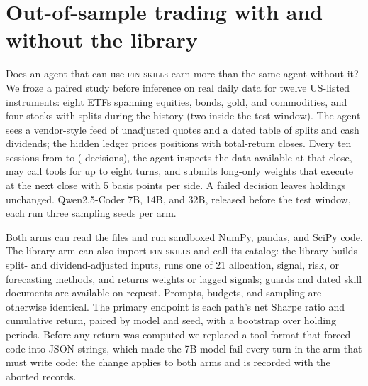 \section{Out-of-sample trading with and without the library}
\label{sec:trading}
Does an agent that can use \textsc{fin-skills} earn more than the same agent without it?
We froze a paired study before inference on real daily data for twelve US-listed
instruments: eight ETFs spanning equities, bonds, gold, and commodities, and four stocks
with splits during the history (two inside the test window). The agent sees a vendor-style
feed of unadjusted quotes and a dated table of splits and cash dividends; the hidden ledger
prices positions with total-return closes. Every ten sessions from
\TRWindowStart{} to \TRWindowEnd{} (\TRDecisions{} decisions), the agent inspects the data
available at that close, may call tools for up to eight turns, and submits long-only
weights that execute at the next close with 5 basis points per side. A failed decision
leaves holdings unchanged. Qwen2.5-Coder 7B, 14B, and 32B, released before the test window,
each run three sampling seeds per arm.

Both arms can read the files and run sandboxed NumPy, pandas, and SciPy code. The library
arm can also import \textsc{fin-skills} and call its catalog: the library builds split- and
dividend-adjusted inputs, runs one of 21 allocation, signal, risk, or forecasting methods,
and returns weights or lagged signals; guards and dated skill documents are available on
request. Prompts, budgets, and sampling are otherwise identical. The primary endpoint is
each path's net Sharpe ratio and cumulative return, paired by model and seed, with a
bootstrap over holding periods. Before any return was computed we replaced a tool format
that forced code into JSON strings, which made the 7B model fail every turn in the arm that
must write code; the change applies to both arms and is recorded with the aborted records.

